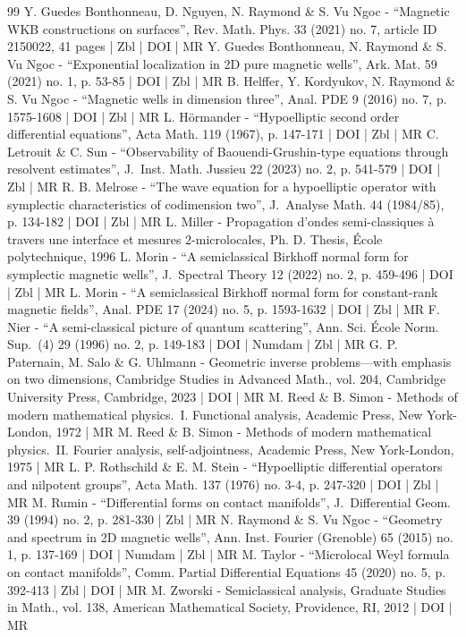 \documentclass[10pt]{amsart}
\theoremstyle{plain}
\theoremstyle{definition}
\theoremstyle{remark}
\begin{document}
\begin{thebibliography}{99}
Y. Guedes Bonthonneau, D. Nguyen, N. Raymond \& S. Vu Ngoc - “Magnetic WKB constructions on surfaces”, Rev. Math. Phys. 33 (2021) no. 7, article ID 2150022, 41 pages | Zbl | DOI | MR
Y. Guedes Bonthonneau, N. Raymond \& S. Vu Ngoc - “Exponential localization in 2D pure magnetic wells”, Ark. Mat. 59 (2021) no. 1, p. 53-85 | DOI | Zbl | MR
B. Helffer, Y. Kordyukov, N. Raymond \& S. Vu Ngoc - “Magnetic wells in dimension three”, Anal. PDE 9 (2016) no. 7, p. 1575-1608 | DOI | Zbl | MR
L. Hörmander - “Hypoelliptic second order differential equations”, Acta Math. 119 (1967), p. 147-171 | DOI | Zbl | MR
C. Letrouit \& C. Sun - “Observability of Baouendi-Grushin-type equations through resolvent estimates”, J. Inst. Math. Jussieu 22 (2023) no. 2, p. 541-579 | DOI | Zbl | MR
R. B. Melrose - “The wave equation for a hypoelliptic operator with symplectic characteristics of codimension two”, J. Analyse Math. 44 (1984/85), p. 134-182 | DOI | Zbl | MR
L. Miller - Propagation d’ondes semi-classiques à travers une interface et mesures $2$-microlocales, Ph. D. Thesis, École polytechnique, 1996
L. Morin - “A semiclassical Birkhoff normal form for symplectic magnetic wells”, J. Spectral Theory 12 (2022) no. 2, p. 459-496 | DOI | Zbl | MR
L. Morin - “A semiclassical Birkhoff normal form for constant-rank magnetic fields”, Anal. PDE 17 (2024) no. 5, p. 1593-1632 | DOI | Zbl | MR
F. Nier - “A semi-classical picture of quantum scattering”, Ann. Sci. École Norm. Sup. (4) 29 (1996) no. 2, p. 149-183 | DOI | Numdam | Zbl | MR
G. P. Paternain, M. Salo \& G. Uhlmann - Geometric inverse problems—with emphasis on two dimensions, Cambridge Studies in Advanced Math., vol. 204, Cambridge University Press, Cambridge, 2023 | DOI | MR
M. Reed \& B. Simon - Methods of modern mathematical physics. I. Functional analysis, Academic Press, New York-London, 1972 | MR
M. Reed \& B. Simon - Methods of modern mathematical physics. II. Fourier analysis, self-adjointness, Academic Press, New York-London, 1975 | MR
L. P. Rothschild \& E. M. Stein - “Hypoelliptic differential operators and nilpotent groups”, Acta Math. 137 (1976) no. 3-4, p. 247-320 | DOI | Zbl | MR
M. Rumin - “Differential forms on contact manifolds”, J. Differential Geom. 39 (1994) no. 2, p. 281-330 | Zbl | MR
N. Raymond \& S. Vu Ngoc - “Geometry and spectrum in 2D magnetic wells”, Ann. Inst. Fourier (Grenoble) 65 (2015) no. 1, p. 137-169 | DOI | Numdam | Zbl | MR
M. Taylor - “Microlocal Weyl formula on contact manifolds”, Comm. Partial Differential Equations 45 (2020) no. 5, p. 392-413 | Zbl | DOI | MR
M. Zworski - Semiclassical analysis, Graduate Studies in Math., vol. 138, American Mathematical Society, Providence, RI, 2012 | DOI | MR
\end{thebibliography}
\end{document}
